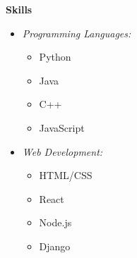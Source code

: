 \textcolor{accentcolor}{\textbf{\large {Skills}}} \\[0.1cm]

\begin{itemize}[left=0pt]
    \item \textit{Programming Languages:}
        \begin{itemize}
            \item Python
            \item Java
            \item C++
            \item JavaScript
        \end{itemize}
    \item \textit{Web Development:}
        \begin{itemize}
            \item HTML/CSS
            \item React
            \item Node.js
            \item Django
        \end{itemize}
\end{itemize}